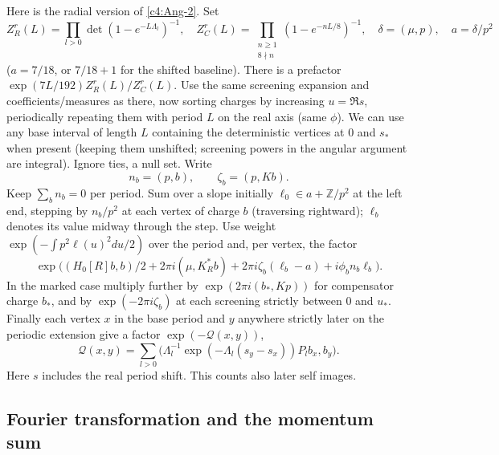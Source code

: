 Here is the radial version of \eqref{c4:Ang-2}. Set
\[
 Z_R^r(L)=\prod_{l>0}\det(1-e^{-L\Lambda_l})^{-1},\quad
 Z_C^r(L)=\prod_{\substack{n\ge1\\8\nmid n}}(1-e^{-nL/8})^{-1},\quad
 \delta=(\mu,p),\quad a=\delta/p^2
\]
(\(a=7/18\), or \(7/18+1\) for the shifted baseline).
There is a prefactor \(\exp(7L/192) Z_R^r(L)/Z_C^r(L)\). Use the same screening expansion and coefficients/measures as there, now sorting charges by increasing \(u=\Re s\), periodically repeating them with period \(L\) on the real axis (same \(\phi\)). We can use any base interval of length \(L\) containing the deterministic vertices at 0 and \(s_*\) when present (keeping them unshifted; screening powers in the angular argument are integral). Ignore ties, a null set. Write
\[
 n_b=(p,b),\qquad \zeta_b=(p,K b).
\]
Keep \(\sum_b n_b=0\) per period. Sum over a slope initially \(\ell_0\in a+\mathbb Z/p^2\) at the left end, stepping by \(n_b/p^2\) at each vertex of charge \(b\) (traversing rightward); \(\ell_b\) denotes its value midway through the step. Use weight \(\exp(-\int p^2\ell(u)^2du/2)\) over the period and, per vertex, the factor
\begin{equation}
 \exp\!\big((H_0[R]b,b)/2 + 2\pi i(\mu,K_R^*b)+2\pi i\zeta_b(\ell_b-a)+i\phi_b n_b\ell_b\big).             \label{c4:Rad-1}
\end{equation}
In the marked case multiply further by \(\exp(2\pi i(b_*,Kp))\) for compensator charge \(b_*\), and by \(\exp(-2\pi i\zeta_b)\) at each screening strictly between 0 and \(u_*\). Finally each vertex \(x\) in the base period and \(y\) anywhere strictly later on the periodic extension give a factor \(\exp(-\mathcal Q(x,y))\),
\begin{equation}
 \mathcal Q(x,y)=\sum_{l>0}
     \big(\Lambda_l^{-1}\exp(-\Lambda_l(s_y-s_x))P_l b_x,b_y\big) .                       \label{c4:Rad-2}
\end{equation}
Here \(s\) includes the real period shift. This counts also later self images.

\subsection{Fourier transformation and the momentum sum}

